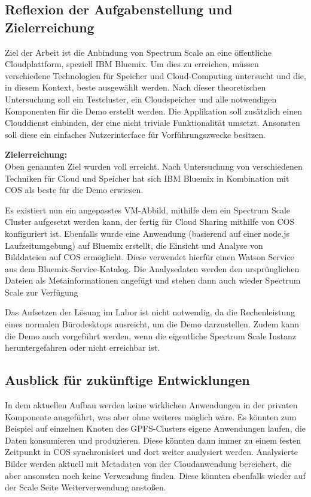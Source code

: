 \subsection{Reflexion der Aufgabenstellung und Zielerreichung}

Ziel der Arbeit ist die Anbindung von Spectrum Scale an eine öffentliche Cloudplattform, speziell IBM Bluemix. Um dies zu erreichen, müssen verschiedene Technologien für Speicher und Cloud-Computing untersucht und die, in diesem Kontext, beste ausgewählt werden. Nach dieser theoretischen Untersuchung soll ein Testcluster, ein Cloudspeicher und alle notwendigen Komponenten für die Demo erstellt werden.
Die Applikation soll zusätzlich einen Clouddienst einbinden, der eine nicht triviale Funktionalität umsetzt. Ansonsten soll diese ein einfaches Nutzerinterface für Vorführungszwecke besitzen.

\textbf{Zielerreichung:}\\
Oben genannten Ziel wurden voll erreicht. Nach Untersuchung von verschiedenen Techniken für Cloud und Speicher hat sich IBM Bluemix in Kombination mit \ac{COS} als beste für die Demo erwiesen. 

Es existiert nun ein angepasstes VM-Abbild, mithilfe dem ein Spectrum Scale Cluster aufgesetzt werden kann, der fertig für Cloud Sharing mithilfe von \acl{COS} konfiguriert ist. Ebenfalls wurde eine Anwendung (basierend auf einer node.js Laufzeitumgebung) auf Bluemix erstellt, die Einsicht und Analyse von Bilddateien auf \ac{COS} ermöglicht. Diese verwendet hierfür einen Watson Service aus dem Bluemix-Service-Katalog. Die Analysedaten werden den ursprünglichen Dateien als Metainformationen angefügt und stehen dann auch wieder Spectrum Scale zur Verfügung 

Das Aufsetzen der Lösung im Labor ist nicht notwendig, da die Rechenleistung eines normalen Bürodesktops ausreicht, um die Demo darzustellen. Zudem kann die Demo auch vorgeführt werden, wenn die eigentliche Spectrum Scale Instanz heruntergefahren oder nicht erreichbar ist.

\subsection{Ausblick für zukünftige Entwicklungen}
In dem aktuellen Aufbau werden keine wirklichen Anwendungen in der privaten Komponente ausgeführt, was aber ohne weiteres möglich wäre. Es könnten zum Beispiel auf einzelnen Knoten des GPFS-Clusters eigene Anwendungen laufen, die Daten konsumieren und produzieren. Diese könnten dann immer zu einem festen Zeitpunkt in \ac{COS} synchronisiert und dort weiter analysiert werden.
Analysierte Bilder werden aktuell mit Metadaten von der Cloudanwendung bereichert, die aber ansonsten noch keine Verwendung finden. Diese könnten ebenfalls wieder auf der Scale Seite Weiterverwendung anstoßen. 

